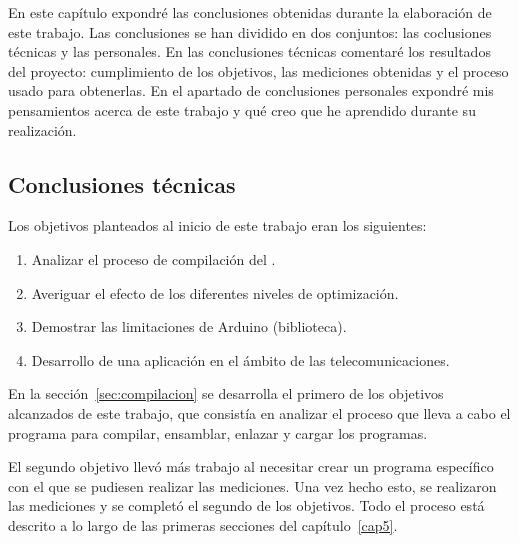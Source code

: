 En este capítulo expondré las conclusiones obtenidas durante la elaboración de este trabajo. Las conclusiones se han dividido en dos conjuntos: las coclusiones técnicas y las personales. En las  conclusiones técnicas comentaré los resultados del proyecto: cumplimiento de los objetivos, las mediciones obtenidas y el proceso usado para obtenerlas. En el apartado de conclusiones personales expondré mis pensamientos acerca de este trabajo y qué creo que he aprendido durante su realización.

\subsection{Conclusiones técnicas}

%
% 

Los objetivos planteados al inicio de este trabajo eran los siguientes:

\begin{enumerate}
    \item Analizar el proceso de compilación del .
    \item Averiguar el efecto de los diferentes niveles de optimización.
    \item Demostrar las limitaciones de Arduino (biblioteca).
    \item Desarrollo de una aplicación en el ámbito de las telecomunicaciones.
\end{enumerate}

En la sección~\ref{sec:compilacion} se desarrolla el primero de los objetivos alcanzados de este trabajo, que consistía en analizar el proceso que lleva a cabo el programa  para compilar, ensamblar, enlazar y cargar los programas.

El segundo objetivo llevó más trabajo al necesitar crear un programa específico con el que se pudiesen realizar las mediciones. Una vez hecho esto, se realizaron las mediciones y se completó el segundo de los objetivos. Todo el proceso está descrito a lo largo de las primeras secciones del capítulo~\ref{cap5}.

